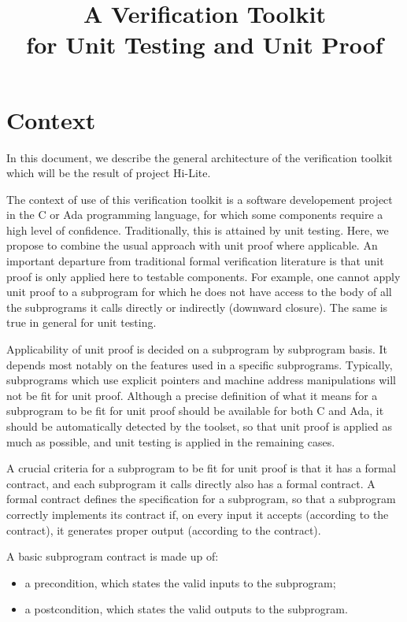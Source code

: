 \documentclass{article}
\title{A Verification Toolkit\\for Unit Testing and Unit Proof}
\begin{document}
\maketitle

\section{Context}

In this document, we describe the general architecture of the verification
toolkit which will be the result of project Hi-Lite.

The context of use of this verification toolkit is a software developement
project in the C or Ada programming language, for which some components require
a high level of confidence. Traditionally, this is attained by unit
testing. Here, we propose to combine the usual approach with unit proof where
applicable. An important departure from traditional formal verification
literature is that unit proof is only applied here to testable components. For
example, one cannot apply unit proof to a subprogram for which he does not have
access to the body of all the subprograms it calls directly or indirectly
(downward closure). The same is true in general for unit testing.

Applicability of unit proof is decided on a subprogram by subprogram basis. It
depends most notably on the features used in a specific subprograms. Typically,
subprograms which use explicit pointers and machine address manipulations will
not be fit for unit proof. Although a precise definition of what it means for a
subprogram to be fit for unit proof should be available for both C and Ada, it
should be automatically detected by the toolset, so that unit proof is applied
as much as possible, and unit testing is applied in the remaining cases.

A crucial criteria for a subprogram to be fit for unit proof is that it has a
formal contract, and each subprogram it calls directly also has a formal
contract. A formal contract defines the specification for a subprogram, so that
a subprogram correctly implements its contract if, on every input it accepts
(according to the contract), it generates proper output (according to the
contract).

A basic subprogram contract is made up of:
\begin{itemize}
\item a precondition, which states the valid inputs to the subprogram;
\item a postcondition, which states the valid outputs to the subprogram.
\end{itemize}
\end{document}
